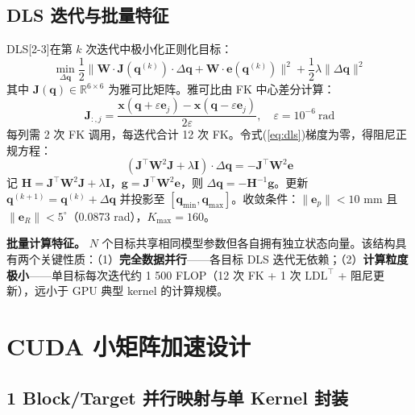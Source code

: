 \documentclass[twocolumn,a4paper,10pt]{ctexart}
\begin{document}
\subsection{DLS 迭代与批量特征}

DLS[2-3]在第 $k$ 次迭代中极小化正则化目标：
\begin{equation}
\min_{\Delta\mathbf{q}} \frac{1}{2}\|\mathbf{W}\!\cdot\!\mathbf{J}(\mathbf{q}^{(k)})\!\cdot\!\Delta\mathbf{q} + \mathbf{W}\!\cdot\!\mathbf{e}(\mathbf{q}^{(k)})\|^2 + \frac{1}{2}\lambda\|\Delta\mathbf{q}\|^2\label{eq:dls}
\end{equation}
其中 $\mathbf{J}(\mathbf{q})\in\mathbb{R}^{6\times6}$ 为雅可比矩阵。雅可比由 FK 中心差分计算：
\begin{equation}
\mathbf{J}_{:,j} = \frac{\mathbf{x}(\mathbf{q}+\varepsilon\mathbf{e}_j)-\mathbf{x}(\mathbf{q}-\varepsilon\mathbf{e}_j)}{2\varepsilon},\quad \varepsilon=10^{-6}\ \mathrm{rad}\label{eq:jacobian}
\end{equation}
每列需 2 次 FK 调用，每迭代合计 12 次 FK。令式(\ref{eq:dls})梯度为零，得阻尼正规方程：
\begin{equation}
(\mathbf{J}^\top\mathbf{W}^2\mathbf{J}+\lambda\mathbf{I})\cdot\Delta\mathbf{q} = -\mathbf{J}^\top\mathbf{W}^2\mathbf{e}\label{eq:normal}
\end{equation}
记 $\mathbf{H}=\mathbf{J}^\top\mathbf{W}^2\mathbf{J}+\lambda\mathbf{I}$，$\mathbf{g}=\mathbf{J}^\top\mathbf{W}^2\mathbf{e}$，则 $\Delta\mathbf{q}=-\mathbf{H}^{-1}\mathbf{g}$。更新 $\mathbf{q}^{(k+1)}=\mathbf{q}^{(k)}+\Delta\mathbf{q}$ 并投影至 $[\mathbf{q}_{\min},\mathbf{q}_{\max}]$。收敛条件：$\|\mathbf{e}_p\|<10$ mm 且 $\|\mathbf{e}_R\|<5^\circ$（0.0873 rad），$K_{\max}=160$。

{\bfseries 批量计算特征。} $N$ 个目标共享相同模型参数但各自拥有独立状态向量。该结构具有两个关键性质：（1）{\bfseries 完全数据并行}——各目标 DLS 迭代无依赖；（2）{\bfseries 计算粒度极小}——单目标每次迭代约 1 500 FLOP（12 次 FK + 1 次 $\mathrm{LDL}^\top$ + 阻尼更新），远小于 GPU 典型 kernel 的计算规模。

\section{CUDA 小矩阵加速设计}\label{sec:design}

\subsection{1 Block/Target 并行映射与单 Kernel 封装}
\end{document}
